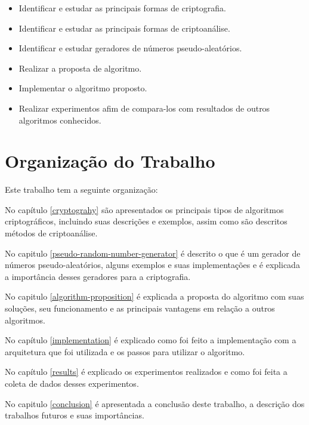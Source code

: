 \begin{itemize}
	\item Identificar e estudar as principais formas de criptografia.
	\item Identificar e estudar as principais formas de criptoanálise.
	\item Identificar e estudar geradores de números pseudo-aleatórios.
	\item Realizar a proposta de algoritmo.
	\item Implementar o algoritmo proposto.
	\item Realizar experimentos afim de compara-los com resultados de outros algoritmos conhecidos.
\end{itemize}

\section{Organização do Trabalho}
\label{paper-organization}

Este trabalho tem a seguinte organização:

No capítulo \ref{cryptograhy} são apresentados os principais tipos de algoritmos criptográficos, incluindo suas descrições e exemplos, assim como são descritos métodos de criptoanálise.

No capitulo \ref{pseudo-random-number-generator} é descrito o que é um gerador de números pseudo-aleatórios, alguns exemplos e suas implementações e é explicada a importância desses geradores para a criptografia. 

No capitulo \ref{algorithm-proposition} é explicada a proposta do algoritmo com suas soluções, seu funcionamento e as principais vantagens em relação a outros algoritmos.

No capítulo \ref{implementation} é explicado como foi feito a implementação com a arquitetura que foi utilizada e os passos para utilizar o algoritmo.

No capítulo \ref{results} é explicado os experimentos realizados e como foi feita a coleta de dados desses experimentos. 

No capitulo \ref{conclusion} é apresentada a conclusão deste trabalho, a descrição dos trabalhos futuros e suas importâncias.